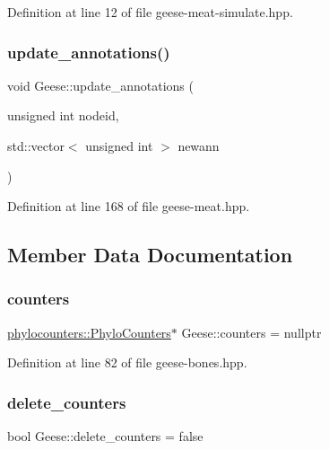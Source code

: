 Definition at line 12 of file geese-\/meat-\/simulate.\+hpp.

\mbox{\label{class_geese_a5d3f0a97dd5d37b6f6cfd79c41629a1a}} 
\subsubsection{\texorpdfstring{update\+\_\+annotations()}{update\_annotations()}}
{\footnotesize\ttfamily void Geese\+::update\+\_\+annotations (\begin{DoxyParamCaption}\item[{unsigned int}]{nodeid,  }\item[{std\+::vector$<$ unsigned int $>$}]{newann }\end{DoxyParamCaption})\hspace{0.3cm}{\ttfamily [inline]}}



Definition at line 168 of file geese-\/meat.\+hpp.



\subsection{Member Data Documentation}
\mbox{\label{class_geese_a4ff7c4927b192966e7765c6e6d1220d9}} 
\subsubsection{\texorpdfstring{counters}{counters}}
{\footnotesize\ttfamily \hyperlink{namespacebarry_1_1counters_1_1phylo_a4e401ffe66d04091343dcffaf915f8c3}{phylocounters\+::\+Phylo\+Counters}$\ast$ Geese\+::counters = nullptr}



Definition at line 82 of file geese-\/bones.\+hpp.

\mbox{\label{class_geese_a2ee3f287368411747c46227568f5d03c}} 
\subsubsection{\texorpdfstring{delete\+\_\+counters}{delete\_counters}}
{\footnotesize\ttfamily bool Geese\+::delete\+\_\+counters = false}




